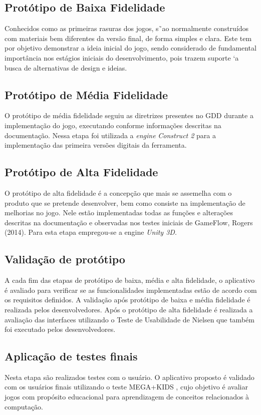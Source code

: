 \documentclass[12pt]{article}
\begin{document}
	\subsection{Protótipo de Baixa Fidelidade}
		Conhecidos como as primeiras rasuras dos jogos, s˜ao normalmente construídos com materiais bem diferentes da versão final, de forma simples e clara. Este tem por objetivo demonstrar a ideia inicial do jogo, sendo considerado de fundamental importância nos estágios iniciais do desenvolvimento, pois trazem suporte `a busca de alternativas de design e ideias.
	
	\subsection{Protótipo de Média Fidelidade}
		O protótipo de média fidelidade seguiu as diretrizes presentes no GDD durante a implementação do jogo, executando conforme informações descritas na documentação. Nessa etapa foi utilizada a \textit{engine} \textit{Construct 2} para a implementação das primeira versões digitais da ferramenta.
	
	\subsection{Protótipo de Alta Fidelidade}
		O protótipo de alta fidelidade é a concepção que mais se assemelha com o produto que se pretende desenvolver, bem como consiste na implementação de melhorias no jogo. Nele estão implementadas todas as funções e alterações descritas na documentação e observadas nos testes iniciais de GameFlow, Rogers (2014). Para esta etapa empregou-se a engine \textit{Unity 3D}.
	
	\subsection{Validação de protótipo}
		A cada fim das etapas de protótipo de baixa, média e alta fidelidade, o aplicativo é avaliado para verificar se as funcionalidades implementadas estão de acordo com os requisitos definidos. A validação após protótipo de baixa e média fidelidade é realizada pelos desenvolvedores. Após o protótipo de alta fidelidade é realizada a avaliação das interfaces utilizando o Teste de Usabilidade de Nielsen \cite{nielsen1994usability} que também foi executado pelos desenvolvedores. 
		
	\subsection{Aplicação de testes finais}
		Nesta etapa são realizados testes com o usuário. O aplicativo proposto é validado com os usuários finais utilizando o teste MEGA+KIDS \cite{von2018meega+}, cujo objetivo é avaliar jogos com propósito educacional para aprendizagem de conceitos relacionados à computação.
		
\end{document}
